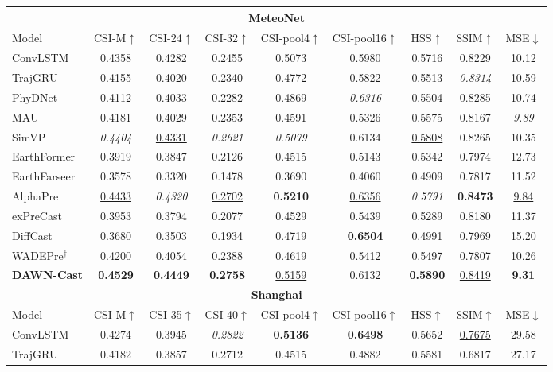 \begin{table}[t]
{\begin{tabular}{l|cccccccc}
\midrule
\multicolumn{9}{c}{\textbf{MeteoNet}} \\
\midrule
Model & CSI-M$\uparrow$ & CSI-24$\uparrow$ & CSI-32$\uparrow$ & CSI-pool4$\uparrow$ & CSI-pool16$\uparrow$ & HSS$\uparrow$ & SSIM$\uparrow$ & MSE$\downarrow$ \\
\midrule
ConvLSTM & 0.4358 & 0.4282 & 0.2455 & 0.5073 & 0.5980 & 0.5716 & 0.8229 & 10.12 \\
TrajGRU & 0.4155 & 0.4020 & 0.2340 & 0.4772 & 0.5822 & 0.5513 & \textit{0.8314} & 10.59 \\
PhyDNet & 0.4112 & 0.4033 & 0.2282 & 0.4869 & \textit{0.6316} & 0.5504 & 0.8285 & 10.74 \\
MAU & 0.4181 & 0.4029 & 0.2353 & 0.4591 & 0.5326 & 0.5575 & 0.8167 & \textit{9.89} \\
SimVP & \textit{0.4404} & \underline{0.4331} & \textit{0.2621} & \textit{0.5079} & 0.6134 & \underline{0.5808} & 0.8265 & 10.35 \\
EarthFormer & 0.3919 & 0.3847 & 0.2126 & 0.4515 & 0.5143 & 0.5342 & 0.7974 & 12.73 \\
EarthFarseer & 0.3578 & 0.3320 & 0.1478 & 0.3690 & 0.4060 & 0.4909 & 0.7817 & 11.52 \\
AlphaPre & \underline{0.4433} & \textit{0.4320} & \underline{0.2702} & \textbf{0.5210} & \underline{0.6356} & \textit{0.5791} & \textbf{0.8473} & \underline{9.84} \\
exPreCast & 0.3953 & 0.3794 & 0.2077 & 0.4529 & 0.5439 & 0.5289 & 0.8180 & 11.37 \\
DiffCast & 0.3680 & 0.3503 & 0.1934 & 0.4719 & \textbf{0.6504} & 0.4991 & 0.7969 & 15.20 \\
WADEPre$^{\dagger}$ & 0.4200 & 0.4054 & 0.2388 & 0.4619 & 0.5412 & 0.5497 & 0.7807 & 10.26 \\
\textbf{DAWN-Cast} & \textbf{0.4529} & \textbf{0.4449} & \textbf{0.2758} & \underline{0.5159} & 0.6132 & \textbf{0.5890} & \underline{0.8419} & \textbf{9.31} \\
\midrule
\multicolumn{9}{c}{\textbf{Shanghai}} \\
\midrule
Model & CSI-M$\uparrow$ & CSI-35$\uparrow$ & CSI-40$\uparrow$ & CSI-pool4$\uparrow$ & CSI-pool16$\uparrow$ & HSS$\uparrow$ & SSIM$\uparrow$ & MSE$\downarrow$ \\
\midrule
ConvLSTM & 0.4274 & 0.3945 & \textit{0.2822} & \textbf{0.5136} & \textbf{0.6498} & 0.5652 & \underline{0.7675} & 29.58 \\
TrajGRU & 0.4182 & 0.3857 & 0.2712 & 0.4515 & 0.4882 & 0.5581 & 0.6817 & 27.17 \\

\end{tabular}}
\end{table}
